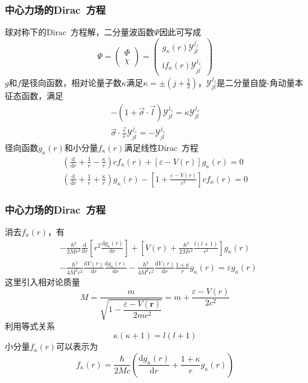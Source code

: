 \frame
{
	\frametitle{中心力场的\textrm{Dirac~}方程}
	球对称下的\textrm{Dirac~}方程解，二分量波函数$\Psi$因此可写成
	\begin{displaymath}
		\Psi=\left( 
		\begin{matrix}
			\Phi\\
			\chi
		\end{matrix}
		\right)=\left( 
		\begin{matrix}
			g_{\kappa}(r)\mathcal{Y}_{jl}^{j_z}\\
			\mathrm{i}f_{\kappa}(r)\mathcal{Y}_{jl^{\prime}}^{j_z}
		\end{matrix}
		\right)
	\end{displaymath}
	$g$和$f$是径向函数，相对论量子数$\kappa$满足$\kappa=\pm(j+\frac12)$，$\mathcal{Y}_{jl}^{j_z}$是二分量自旋-角动量本征态函数，满足
	\begin{displaymath}
		\begin{aligned}
			-(1+\vec{\sigma}\cdot\vec l)\mathcal{Y}_{jl}^{j_z}=\kappa\mathcal{Y}_{jl}^{j_z}\\
			\vec{\sigma}\cdot\frac{\vec r}r\mathcal{Y}_{jl}^{j_z}=-\mathcal{Y}_{jl}^{j_z}
		\end{aligned}
	\end{displaymath}
	径向函数$g_{\kappa}(r)$和小分量$f_{\kappa}(r)$满足线性\textrm{Dirac~}方程
	\begin{displaymath}
		\begin{aligned}
			\left( \frac{\mathrm{d}}{\mathrm{d}r}+\frac1r-\frac{\kappa}r \right)cf_{\kappa}(r)+[\varepsilon-V(r)]g_{\kappa}(r)=0\\
			\left( \frac{\mathrm{d}}{\mathrm{d}r}+\frac1r+\frac{\kappa}r \right)g_{\kappa}(r)-\left[ 1+\frac{\varepsilon-V(r)}{c^2} \right]cf_{\kappa}(r)=0
		\end{aligned}
	\end{displaymath}
}

\frame
{
	\frametitle{中心力场的\textrm{Dirac~}方程}
	消去$f_{\kappa}(r)$，有
	\begin{displaymath}
		\begin{aligned}
			&-\frac{\hbar^2}{2Mr^2}\frac{\mathrm{d}}{\mathrm{d}r}\left[ r^2\frac{\mathrm{d}g_{\kappa}(r)}{\mathrm{d}r} \right]+\left[ V(r)+\frac{\hbar^2}{2Mr^2}\frac{l(l+1)}{r^2} \right]g_{\kappa}(r)\\
			&-\frac{\hbar^2}{4M^2c^2}\frac{\mathrm{d}V(r)}{\mathrm{d}r}\frac{\mathrm{d}g_{\kappa}(r)}{\mathrm{d}r}-\frac{\hbar^2}{4M^2c^2}\frac{\mathrm{d}V(r)}{\mathrm{d}r}\frac{1+\kappa}rg_{\kappa}(r)=\varepsilon g_{\kappa}(r)
		\end{aligned}
	\end{displaymath}
	这里引入相对论质量$$M=\dfrac{m}{\sqrt{1-\dfrac{\varepsilon-V(\mathbf{r})}{2mc^2}}}=m+\frac{\varepsilon-V(r)}{2c^2}$$
	利用等式关系$$\kappa(\kappa+1)=l(l+1)$$
	小分量$f_{\kappa}(r)$可以表示为
	\begin{displaymath}
		f_{\kappa}(r)=\frac{\hbar}{2Mc}\left( \frac{\mathrm{d}g_{\kappa}(r)}{\mathrm{d}r}+\frac{1+\kappa}rg_{\kappa}(r) \right)
	\end{displaymath}
}

